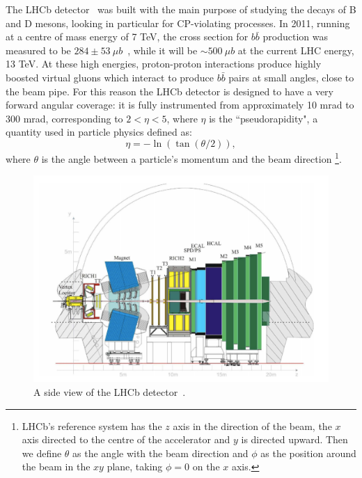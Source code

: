 The LHCb detector~\cite{Alves:2008zz} was built with the main purpose of studying the decays of B and D mesons, looking in particular for
CP-violating processes. In 2011, running at a centre of mass energy of 7 TeV, the cross section for $b\bar{b}$ production
was measured to be $284 \pm 53 ~\mu b$~\cite{Aaij:2010gn}, while it will be $\sim500 ~\mu b$ at the current LHC energy, 13 TeV.
At these high energies, proton-proton interactions produce highly boosted virtual gluons which interact to produce $b\bar{b}$
pairs at small angles, close to the beam pipe. For this reason the LHCb detector is designed to have a very forward angular
coverage: it is fully instrumented from approximately 10 mrad to 300 mrad, corresponding to $2 < \eta < 5$, where $\eta$
is the ``pseudorapidity", a quantity used in particle physics defined as:
\begin{equation}
\label{pseudorap}
\eta = - \ln(\tan(\theta/2)),
\end{equation}
where $\theta$ is the angle between a particle's momentum and the beam direction
\footnote{LHCb's reference system has the $z$ axis in the direction of the beam, the $x$ axis directed to
the centre of the accelerator and $y$ is directed upward. Then we define $\theta$ as the angle with the beam
direction and $\phi$ as the position around the beam in the $xy$ plane, taking $\phi = 0$ on the $x$ axis.}.

\begin{figure}[h]
\includegraphics[width=1.\linewidth]{Detector/figs/LHCb_official.png}
\caption{A side view of the LHCb detector~\cite{Alves:2008zz}.}
\label{fig:lhcb}
\end{figure}

